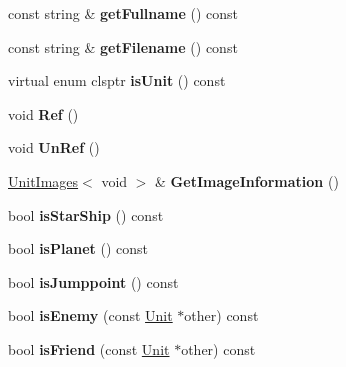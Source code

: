 \begin{DoxyCompactItemize}
\item 
const string \& {\bfseries get\+Fullname} () const \hypertarget{classUnit_a314e0ef3b1af37b5d00be7178c769c1b}{}\label{classUnit_a314e0ef3b1af37b5d00be7178c769c1b}

\item 
const string \& {\bfseries get\+Filename} () const \hypertarget{classUnit_a1732a44abb3469c248ee8efb5598feb1}{}\label{classUnit_a1732a44abb3469c248ee8efb5598feb1}

\item 
virtual enum clsptr {\bfseries is\+Unit} () const \hypertarget{classUnit_af19d807f19215e15b117029b5aa240ce}{}\label{classUnit_af19d807f19215e15b117029b5aa240ce}

\item 
void {\bfseries Ref} ()\hypertarget{classUnit_a3231bf3f133744e0bb820804f5223451}{}\label{classUnit_a3231bf3f133744e0bb820804f5223451}

\item 
void {\bfseries Un\+Ref} ()\hypertarget{classUnit_a2d46a93ca4d6f78000ade6bea0bf02f8}{}\label{classUnit_a2d46a93ca4d6f78000ade6bea0bf02f8}

\item 
\hyperlink{structUnitImages}{Unit\+Images}$<$ void $>$ \& {\bfseries Get\+Image\+Information} ()\hypertarget{classUnit_a703c0866b1e2a734eb5bf117a91f7edc}{}\label{classUnit_a703c0866b1e2a734eb5bf117a91f7edc}

\item 
bool {\bfseries is\+Star\+Ship} () const \hypertarget{classUnit_af9472134841ac4f77e86b06775e4b64f}{}\label{classUnit_af9472134841ac4f77e86b06775e4b64f}

\item 
bool {\bfseries is\+Planet} () const \hypertarget{classUnit_a974ed47031d8a0104fbdcac761d9bf96}{}\label{classUnit_a974ed47031d8a0104fbdcac761d9bf96}

\item 
bool {\bfseries is\+Jumppoint} () const \hypertarget{classUnit_a32416ed15a2b4355a8344962ef01f3a4}{}\label{classUnit_a32416ed15a2b4355a8344962ef01f3a4}

\item 
bool {\bfseries is\+Enemy} (const \hyperlink{classUnit}{Unit} $\ast$other) const \hypertarget{classUnit_ad575a5edf34aa1f7ce08af8efc7d000b}{}\label{classUnit_ad575a5edf34aa1f7ce08af8efc7d000b}

\item 
bool {\bfseries is\+Friend} (const \hyperlink{classUnit}{Unit} $\ast$other) const \hypertarget{classUnit_af863ba38b831f0d2c1d54b7776ae38db}{}\label{classUnit_af863ba38b831f0d2c1d54b7776ae38db}


\end{DoxyCompactItemize}
